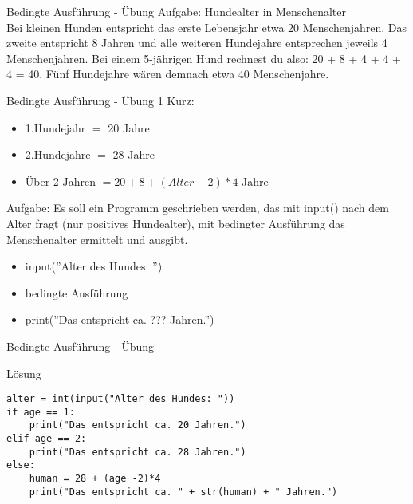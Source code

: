 \begin{frame}{Bedingte Ausführung - Übung}
Aufgabe: Hundealter in Menschenalter\\
Bei kleinen Hunden entspricht das erste Lebensjahr etwa 20 Menschenjahren. Das zweite entspricht 8 Jahren und alle weiteren Hundejahre entsprechen jeweils 4 Menschenjahren. Bei einem 5-jährigen Hund rechnest du also: 20 + 8 + 4 + 4 + 4 = 40. Fünf Hundejahre wären demnach etwa 40 Menschenjahre.\\
\end{frame}
\begin{frame}{Bedingte Ausführung - Übung 1}
Kurz:
\begin{itemize}
\item 1.Hundejahr $=$ 20 Jahre
\item 2.Hundejahre $=$ 28 Jahre
\item Über 2 Jahren $= 20 + 8 + (Alter - 2)  *  4$ Jahre
\end{itemize}
Aufgabe:
Es soll ein Programm geschrieben werden, das mit input() nach dem Alter fragt (nur positives Hundealter), mit bedingter Ausführung das Menschenalter ermittelt und ausgibt.
\begin{itemize}
	\item input(''Alter des Hundes: '')
	\item bedingte Ausführung
	\item print(''Das entspricht ca. ??? Jahren.'')
\end{itemize}

\end{frame}

\begin{frame}[fragile]{Bedingte Ausführung - Übung}
\begin{exampleblock}{Lösung}
\begin{lstlisting}
alter = int(input("Alter des Hundes: "))
if age == 1:
	print("Das entspricht ca. 20 Jahren.")
elif age == 2:
	print("Das entspricht ca. 28 Jahren.")
else:
	human = 28 + (age -2)*4
	print("Das entspricht ca. " + str(human) + " Jahren.")
\end{lstlisting}
\end{exampleblock}
\end{frame}



